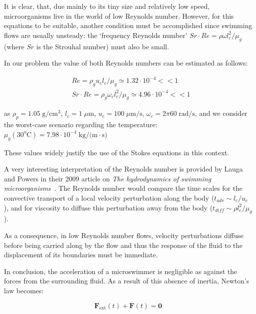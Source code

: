 It is clear, that, due mainly to its tiny size and relatively low speed, microorganisms live in the world of low Reynolds number. However, for this equations to be suitable, another condition must be accomplished since swimming flows are usually unsteady: the ‘frequency Reynolds number’ $Sr \cdot Re = \rho \omega l_c^2/ \mu_g$ (where $Sr$ is the Strouhal number) must also be small.

In our problem the value of both Reynolds numbers can be estimated as follows:

\begin{equation}
	\begin{aligned} & Re = \rho_g u_c l_c/\mu_g \simeq 1.32 \cdot 10^{-4} << 1\\
	& Sr \cdot Re = \rho_g \omega_cl_c^2/ \mu_g \simeq 4.96 \cdot 10^{-4} << 1 \end{aligned}
\end{equation}

as $\rho_p = 1.05 \; \textrm{g/} \textrm{cm}^\textrm{3}$, $l_c = 1 \; \mu \textrm{m}$,  $u_c = 100 \; \mu \textrm{m/s}$,  $\omega_c = 2 \pi 60 \; \textrm{rad/s}$, and we consider the worst-case scenario regarding the temperature: $\mu_g(30^\textrm{o}\textrm{C}) = 7.98 \cdot 10^{-4} \; \textrm{kg/(m} \cdot \textrm{s)}$

These values widely justify the use of the Stokes equations in this context.

A very interesting interpretation of the Reynolds number is provided by Lauga and Powers in their 2009 article on \textit{The hydrodynamics of swimming microorganisms}~\cite{Lauga}. The Reynolds number would compare the time scales for the convective transport of a local velocity perturbation along the body ($t_{adv} \sim l_c/u_c$), and for viscosity to diffuse this perturbation  away from the body ($t_{diff} \sim ρl_c^2/ \mu_g$). 

As a consequence, in low Reynolds number flows, velocity perturbations diffuse before being carried along by the flow and thus the response of the fluid to the displacement of its boundaries must be immediate. 

In conclusion, the acceleration of a microswimmer is negligible as against the forces from the surrounding fluid. As a result of this absence of inertia, Newton’s law becomes:

\begin{equation}
\mathbf{F_{\mathrm{ext}}}(t)+\mathbf{F}(t)= \mathbf{0}
\end{equation}

